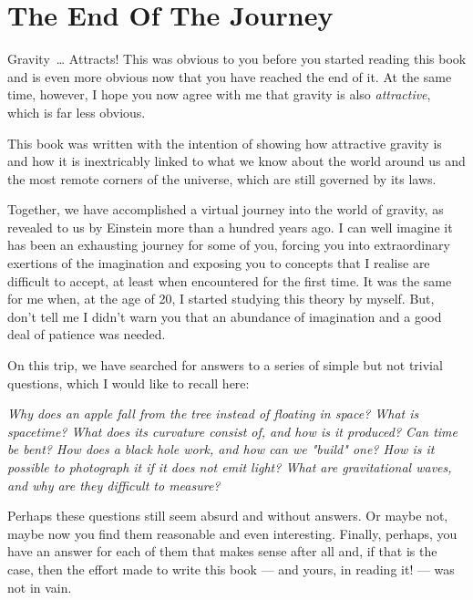 \chapter*{The End Of The Journey}\label{conclusion}

Gravity~\ldots{} Attracts! This was obvious to you before you started reading this book
and is even more obvious now that you have reached the end of it. At the same time,
however, I hope you now agree with me that gravity is also \emph{attractive}, which is
far less obvious.

This book was written with the intention of showing how attractive gravity is and how it
is inextricably linked to what we know about the world around us and the most remote
corners of the universe, which are still governed by its laws.

Together, we have accomplished a virtual journey into the world of gravity, as revealed
to us by Einstein more than a hundred years ago. I can well imagine it has been an
exhausting journey for some of you, forcing you into extraordinary exertions of the
imagination and exposing you to concepts that I realise are difficult to accept, at
least when encountered for the first time. It was the same for me when, at the age of
20, I started studying this theory by myself. But, don't tell me I didn't warn you that
an abundance of imagination and a good deal of patience was needed.

On this trip, we have searched for answers to a series of simple but not trivial
questions, which I would like to recall here:

\emph{Why does an apple fall from the tree instead of floating in space? What is
spacetime? What does its curvature consist of, and how is it produced? Can time be bent?
How does a black hole work, and how can we "build" one? How is it possible to photograph
it if it does not emit light? What are gravitational waves, and why are they difficult
to measure?}

Perhaps these questions still seem absurd and without answers. Or maybe not, maybe now
you find them reasonable and even interesting. Finally, perhaps, you have an answer for
each of them that makes sense after all and, if that is the case, then the effort made
to write this book --- and yours, in reading it! --- was not in vain.

